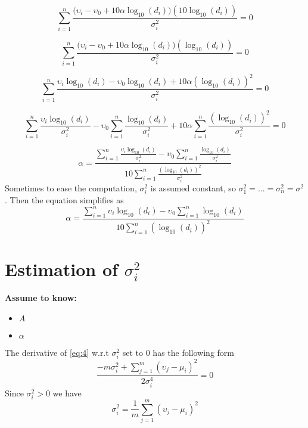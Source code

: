 \documentclass[12pt,twoside]{report}
\begin{document}
\begin{equation}
\sum_{i=1}^n\frac{\big(\upsilon_i-\upsilon_0+10\alpha\log_{10}(d_i)\big)(10\log_{10}(d_i))}{\sigma^2_i}=0
\end{equation}

\begin{equation}
\sum_{i=1}^n\frac{\big(\upsilon_i-\upsilon_0+10\alpha\log_{10}(d_i)\big)(\log_{10}(d_i))}{\sigma^2_i}=0
\end{equation}

\begin{equation}
\sum_{i=1}^n\frac{\upsilon_i\log_{10}(d_i)-\upsilon_0\log_{10}(d_i)+10\alpha(\log_{10}(d_i))^2}{\sigma^2_i}=0
\end{equation}

\begin{equation}
\sum_{i=1}^n\frac{\upsilon_i\log_{10}(d_i)}{\sigma^2_i}-\upsilon_0\sum_{i=1}^n\frac{\log_{10}(d_i)}{\sigma^2_i}+10\alpha\sum_{i=1}^n\frac{(\log_{10}(d_i))^2}{\sigma^2_i}=0
\end{equation}

\begin{equation}
\alpha=\frac{\sum_{i=1}^n\frac{\upsilon_i\log_{10}(d_i)}{\sigma^2_i}-\upsilon_0\sum_{i=1}^n\frac{\log_{10}(d_i)}{\sigma^2_i}}{10\sum_{i=1}^n\frac{(\log_{10}(d_i))^2}{\sigma^2_i}}
\end{equation}
Sometimes to ease the computation, $\sigma^2_i$ is assumed constant, so $\sigma_1^2=...=\sigma_n^2=\sigma^2$. Then the equation simplifies as
\begin{equation}
\alpha=\frac{\sum_{i=1}^n\upsilon_i\log_{10}(d_i)-\upsilon_0\sum_{i=1}^n\log_{10}(d_i)}{10\sum_{i=1}^n(\log_{10}(d_i))^2}
\end{equation}
\section{Estimation of $\sigma^2_i$}
  \begin{center}
  \textbf{Assume to know:}
  \begin{itemize}
    \centering
    \item $A$
    \item $\alpha$
  \end{itemize}
  \end{center}
The derivative of \ref{eq:4} w.r.t $\sigma^2_i$ set to $0$ has the following form 
\begin{equation}
    \frac{-m\sigma^2_i+\sum_{j=1}^m(\upsilon_j-\mu_i)^2}{2\sigma^4_i}=0
\end{equation}
Since $\sigma^2_i>0$ we have
\begin{equation}
    \sigma^2_i=\frac{1}{m}\sum_{j=1}^m(\upsilon_j-\mu_i)^2
\end{equation}
\end{document}
